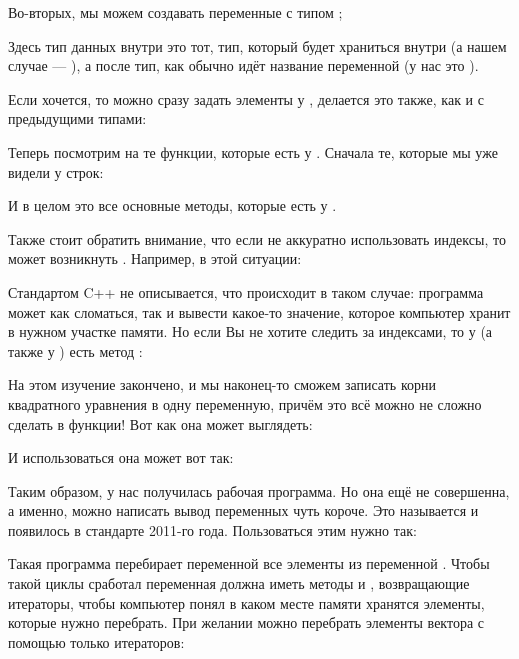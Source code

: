 
Во-вторых, мы можем создавать переменные с типом ;


Здесь тип данных внутри \lcpp{<>} это тот, тип, который будет храниться внутри  (а нашем случае — ), а после тип, как обычно идёт название переменной (у нас это ). 

Если хочется, то можно сразу задать элементы у , делается это также, как и с предыдущими типами:


Теперь посмотрим на те функции, которые есть у . Сначала те, которые мы уже видели у строк:


И в целом это все основные методы, которые есть у .

Также стоит обратить внимание, что если не аккуратно использовать индексы, то может возникнуть . Например, в этой ситуации:


Стандартом C++ не описывается, что происходит в таком случае: программа может как сломаться, так и вывести какое-то значение, которое компьютер хранит в нужном участке памяти. Но если Вы не хотите следить за индексами, то у  (а также у ) есть метод :

 
На этом изучение  закончено, и мы наконец-то сможем записать корни квадратного уравнения в одну переменную, причём это всё можно не сложно сделать в функции! Вот как она может выглядеть:


И использоваться она может вот так:


Таким образом, у нас получилась рабочая программа. Но она ещё не совершенна, а именно, можно написать вывод переменных чуть короче. Это называется  и появилось в стандарте 2011-го года. Пользоваться этим нужно так:


Такая программа перебирает переменной  все элементы из переменной . Чтобы такой циклы сработал переменная  должна иметь методы  и , возвращающие итераторы, чтобы компьютер понял в каком месте памяти хранятся элементы, которые нужно перебрать. При желании можно перебрать элементы вектора с помощью только итераторов:


